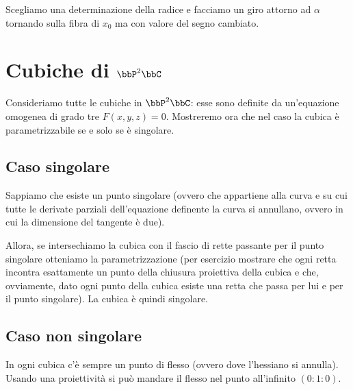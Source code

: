 
Scegliamo una determinazione della radice e facciamo un giro attorno ad
$\alpha$ tornando sulla fibra di $x_0$ ma con valore del segno cambiato.

\section{Cubiche di $\bbP^2\bbC$}
Consideriamo tutte le cubiche in $\bbP^2\bbC$: esse sono definite da
un'equazione omogenea di grado tre $F(x, y, z) = 0$. Mostreremo ora che
nel caso la cubica è parametrizzabile se e solo se è singolare.


\subsection{Caso singolare}
Sappiamo che esiste un punto singolare (ovvero che appartiene alla curva
e su cui tutte le derivate parziali dell'equazione definente la curva si
annullano, ovvero in cui la dimensione del tangente è due).

Allora, se intersechiamo la cubica con il fascio di rette passante per
il punto singolare otteniamo la parametrizzazione (per esercizio
mostrare che ogni retta incontra esattamente un punto della chiusura
proiettiva della cubica e che, ovviamente, dato ogni punto della cubica
esiste una retta che passa per lui e per il punto singolare). La cubica
è quindi singolare.


\subsection{Caso non singolare}
In ogni cubica c'è sempre un punto di flesso (ovvero dove l'hessiano si
annulla). Usando una proiettività si può mandare il flesso nel punto
all'infinito $(0 : 1 : 0)$.



